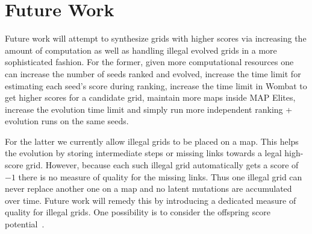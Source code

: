 \section{Future Work}

Future work will attempt to synthesize grids with higher scores via increasing the amount of computation as well as handling illegal evolved grids in a more sophisticated fashion. For the former, given more computational resources one can increase the number of seeds ranked and evolved, increase the time limit for estimating each seed's score during ranking, increase the time limit in {\sc Wombat} to get higher scores for a candidate grid, maintain more maps inside MAP Elites, increase the evolution time limit and simply run more independent ranking + evolution runs on the same seeds. 

For the latter we currently allow illegal grids to be placed on a map. This helps the evolution by storing intermediate steps or missing links towards a legal high-score grid. However, because each such illegal grid automatically gets a score of $-1$ there is no measure of quality for the missing links. Thus one illegal grid can never replace another one on a map and no latent mutations are accumulated over time. Future work will remedy this by introducing a dedicated measure of quality for illegal grids. One possibility is to consider the offspring score potential~\cite{FI2Pop,FI2Pop2}.